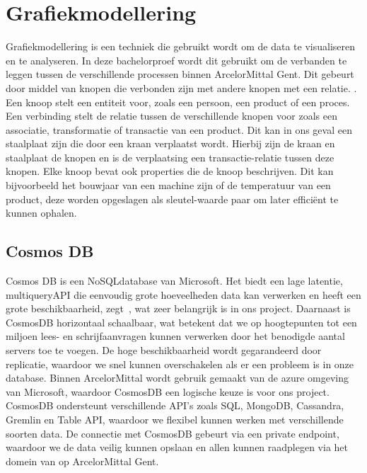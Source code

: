 \label{sec:grafiekmodellering}
\section{Grafiekmodellering}
Grafiekmodellering is een techniek die gebruikt wordt om de data te visualiseren en te analyseren. In deze bachelorproef wordt dit gebruikt om de verbanden te leggen tussen de verschillende processen binnen ArcelorMittal Gent.
Dit gebeurt door middel van knopen die verbonden zijn met andere knopen met een relatie. \autocite{neo4j20252}.
Een knoop stelt een entiteit voor, zoals een persoon, een product of een proces. Een verbinding stelt de relatie tussen de verschillende knopen voor zoals een associatie, transformatie of transactie van een product.
Dit kan in ons geval een staalplaat zijn die door een kraan verplaatst wordt. Hierbij zijn de kraan en staalplaat de knopen en is de verplaatsing een transactie-relatie tussen deze knopen.
Elke knoop bevat ook properties die de knoop beschrijven. Dit kan bijvoorbeeld het bouwjaar van een machine zijn of de temperatuur van een product, deze worden opgeslagen als sleutel-waarde paar om later efficiënt te kunnen ophalen.

\subsection{Cosmos DB}%
Cosmos DB is een NoSQL\-database van Microsoft. Het biedt een lage latentie, multi\-query\-API die eenvoudig grote hoeveelheden data kan verwerken en heeft een grote beschikbaarheid, zegt~\textcite{Put2020}, wat zeer belangrijk is in ons project.
Daarnaast is CosmosDB horizontaal schaalbaar, wat betekent dat we op hoogtepunten tot een miljoen lees- en schrijfaanvragen kunnen verwerken door het benodigde aantal servers toe te voegen.
De hoge beschikbaarheid wordt gegarandeerd door replicatie, waardoor we snel kunnen overschakelen als er een probleem is in onze database.
Binnen ArcelorMittal wordt gebruik gemaakt van de azure omgeving van Microsoft, waardoor CosmosDB een logische keuze is voor ons project.
CosmosDB ondersteunt verschillende API's zoals SQL, MongoDB, Cassandra, Gremlin en Table API, waardoor we flexibel kunnen werken met verschillende soorten data.
De connectie met CosmosDB gebeurt via een private endpoint, waardoor we de data veilig kunnen opslaan en allen kunnen raadplegen via het domein van op ArcelorMittal Gent.
